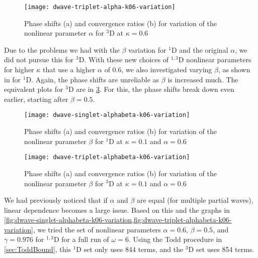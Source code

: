 \documentclass[Dissertation.tex]{subfiles}
\begin{document}
\begin{figure}[H]
	\centering
	\texttt{[image: dwave-triplet-alpha-k06-variation]}
	\caption[Variation of the nonlinear parameter $\alpha$ for $^{3}$D at $\kappa = 0.6$]{Phase shifts (a) and convergence ratios (b) for variation of the nonlinear parameter $\alpha$ for $^{3}$D at $\kappa = 0.6$}
	\label{fig:dwave-triplet-alpha-k06-variation}
\end{figure}

Due to the problems we had with the $\beta$ variation for $^1$D
and the original $\alpha$, we did not pursue this for $^3$D.
With these new choices of $^{1,3}$D nonlinear parameters for higher $\kappa$
that use a higher $\alpha$ of 0.6, we also investigated varying $\beta$, as
shown in  for $^1$D.
Again, the phase shifts are unreliable as $\beta$ is increased much.
The equivalent plots for $^3$D are in \cref{fig:dwave-triplet-alphabeta-k06-variation}.
For this, the phase shifts break down even earlier, starting after $\beta = 0.5$.

\begin{figure}[H]
	\centering
	\texttt{[image: dwave-singlet-alphabeta-k06-variation]}
	\caption[Variation of the nonlinear parameter $\beta$ for $^{1}$D at $\kappa = 0.1$ and $\alpha = 0.6$]{Phase shifts (a) and convergence ratios (b) for variation of the nonlinear parameter $\beta$ for $^{1}$D at $\kappa = 0.1$ and $\alpha = 0.6$}
	\label{fig:dwave-singlet-alphabeta-k06-variation}
\end{figure}

\begin{figure}[H]
	\centering
	\texttt{[image: dwave-triplet-alphabeta-k06-variation]}
	\caption[Variation of the nonlinear parameter $\beta$ for $^{3}$D at $\kappa = 0.1$ and $\alpha = 0.6$]{Phase shifts (a) and convergence ratios (b) for variation of the nonlinear parameter $\beta$ for $^{3}$D at $\kappa = 0.1$ and $\alpha = 0.6$}
	\label{fig:dwave-triplet-alphabeta-k06-variation}
\end{figure}

We had previously noticed that if $\alpha$ and $\beta$ are equal (for multiple
partial waves), linear dependence becomes a large issue. Based on this and the
graphs in \cref{fig:dwave-singlet-alphabeta-k06-variation,fig:dwave-triplet-alphabeta-k06-variation},
we tried the set of nonlinear parameters $\alpha = 0.6$, $\beta = 0.5$,
and $\gamma = 0.976$ for $^{1,3}$D for a full run of $\omega = 6$.
Using the Todd procedure in \cref{sec:ToddBound}, this $^1$D set only uses 844
terms, and the $^3$D set uses 854 terms.
\end{document}
